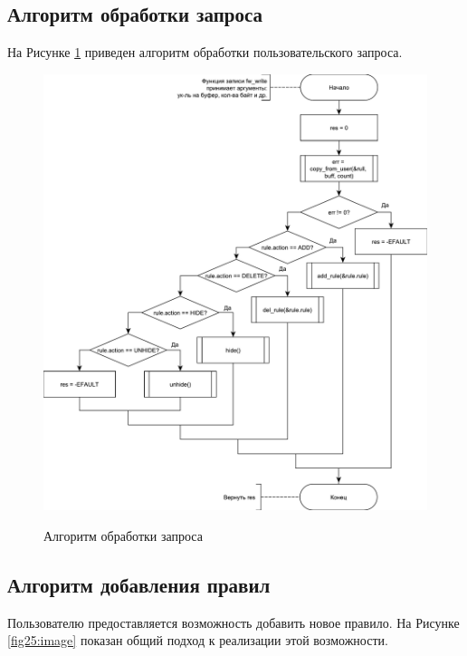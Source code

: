 \subsection{Алгоритм обработки запроса}
На Рисунке \ref{fig24:image} приведен алгоритм обработки пользовательского запроса.
\begin{figure}[h!]
	\begin{center}
		{\includegraphics[scale = 0.6]{img/write.pdf}}
		\caption{Алгоритм обработки запроса}
		\label{fig24:image}
	\end{center}
\end{figure}

\newpage

\subsection{Алгоритм добавления правил}
Пользователю предоставляется возможность добавить новое правило. На Рисунке \ref{fig25:image} показан общий подход к реализации этой возможности.

